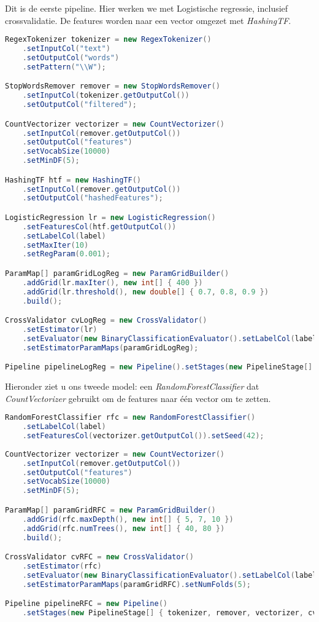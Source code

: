 \documentclass[a4paper,10pt,twoside]{report}
\begin{document}
\newpage

Dit is de eerste pipeline. Hier werken we met Logistische regressie, inclusief crossvalidatie. De features worden naar een vector omgezet met \textit{HashingTF}.

\begin{lstlisting}[language=Java]
RegexTokenizer tokenizer = new RegexTokenizer()
	.setInputCol("text")
	.setOutputCol("words")
	.setPattern("\\W");

StopWordsRemover remover = new StopWordsRemover()
	.setInputCol(tokenizer.getOutputCol())
	.setOutputCol("filtered");

CountVectorizer vectorizer = new CountVectorizer()
	.setInputCol(remover.getOutputCol())
	.setOutputCol("features")
	.setVocabSize(10000)
	.setMinDF(5);

HashingTF htf = new HashingTF()
	.setInputCol(remover.getOutputCol())
	.setOutputCol("hashedFeatures");

LogisticRegression lr = new LogisticRegression()
	.setFeaturesCol(htf.getOutputCol())
	.setLabelCol(label)
	.setMaxIter(10)
	.setRegParam(0.001);

ParamMap[] paramGridLogReg = new ParamGridBuilder()
	.addGrid(lr.maxIter(), new int[] { 400 })
	.addGrid(lr.threshold(), new double[] { 0.7, 0.8, 0.9 })
	.build();

CrossValidator cvLogReg = new CrossValidator()
	.setEstimator(lr)
	.setEvaluator(new BinaryClassificationEvaluator().setLabelCol(label))
	.setEstimatorParamMaps(paramGridLogReg);

Pipeline pipelineLogReg = new Pipeline().setStages(new PipelineStage[] { tokenizer, remover, hashingTF, cvLogReg});
\end{lstlisting}

Hieronder ziet u ons tweede model: een \textit{RandomForestClassifier} dat \textit{CountVectorizer} gebruikt om de features naar één vector om te zetten.

\begin{lstlisting}[language=Java]
RandomForestClassifier rfc = new RandomForestClassifier()
	.setLabelCol(label)
	.setFeaturesCol(vectorizer.getOutputCol()).setSeed(42);
	
CountVectorizer vectorizer = new CountVectorizer()
	.setInputCol(remover.getOutputCol())
	.setOutputCol("features")
	.setVocabSize(10000)
	.setMinDF(5);

ParamMap[] paramGridRFC = new ParamGridBuilder()
	.addGrid(rfc.maxDepth(), new int[] { 5, 7, 10 })
	.addGrid(rfc.numTrees(), new int[] { 40, 80 })
	.build();

CrossValidator cvRFC = new CrossValidator()
	.setEstimator(rfc)
	.setEvaluator(new BinaryClassificationEvaluator().setLabelCol(label))
	.setEstimatorParamMaps(paramGridRFC).setNumFolds(5);

Pipeline pipelineRFC = new Pipeline()
	.setStages(new PipelineStage[] { tokenizer, remover, vectorizer, cvRFC});
\end{lstlisting}
\end{document}
